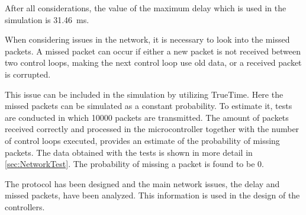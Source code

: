 After all considerations, the value of the maximum delay which is used in the simulation is \SI{31.46}{ms}.

When considering issues in the network, it is necessary to look into the missed packets. A missed packet can occur if either a new packet is not received between two control loops, making the next control loop use old data, or a received packet is corrupted.

This issue can be included in the simulation by utilizing TrueTime. Here the missed packets can be simulated as a constant probability. To estimate it, tests are conducted in which 10000 packets are transmitted. The amount of packets received correctly and processed in the microcontroller together with the number of control loops executed, provides an estimate of the probability of missing packets. The data obtained with the tests is shown in more detail in \autoref{sec:NetworkTest}. The probability of missing a packet is found to be 0.

The protocol has been designed and the main network issues, the delay and missed packets, have been analyzed. This information is used in the design of the controllers.
